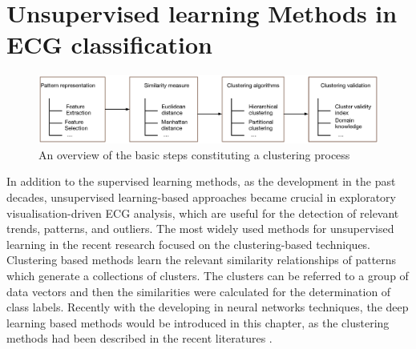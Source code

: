 \documentclass[graybox]{svmult}
\begin{document}

\section{Unsupervised learning Methods in ECG classification}
%
\begin{figure}[]
\sidecaption
\includegraphics[scale=.32]{clustering}
%
%
\caption{An overview of the basic steps constituting a clustering process}
\label{fig:2}       %
\end{figure}

In addition to the supervised learning methods, as the development in the past decades, unsupervised learning-based approaches became crucial in exploratory visualisation-driven ECG analysis, which are useful for the detection of relevant trends, patterns, and outliers.  The most widely used methods for unsupervised learning in the recent research focused on the clustering-based techniques. Clustering based methods learn the relevant similarity relationships of patterns which generate a collections of clusters. The clusters can be referred to a group of data vectors and then the similarities were calculated for the determination of class labels. Recently with the developing in neural networks techniques, the deep learning based methods would be introduced in this chapter, as the clustering methods had been described in the recent literatures \cite{}.







\end{document}
